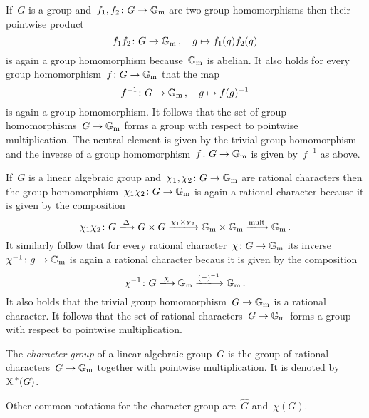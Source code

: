 \begin{fluff}
  If~$G$ is a group and~$f_1, f_2 \colon G \to \mathbb{G}_{\text{m}}$ are two group homomorphisms then their pointwise product
  \[
            f_1 f_2
    \colon  G
    \to     \mathbb{G}_{\text{m}} \,,
    \quad   g
    \mapsto f_1(g) f_2(g)
  \]
  is again a group homomorphism because~$\mathbb{G}_{\text{m}}$ is abelian.
  It also holds for every group homomorphism~$f \colon G \to \mathbb{G}_{\text{m}}$ that the map
  \[
            f^{-1}
    \colon  G
    \to     \mathbb{G}_{\text{m}} \,,
    \quad   g
    \mapsto f(g)^{-1}
  \]
  is again a group homomorphism.
  It follows that the set of group homomorphisms~$G \to \mathbb{G}_{\text{m}}$ forms a group with respect to pointwise multiplication.
  The neutral element is given by the trivial group homomorphism and the inverse of a group homomorphism~$f \colon G \to \mathbb{G}_{\text{m}}$ is given by~$f^{-1}$ as above.
  
  If~$G$ is a linear algebraic group and~$\chi_1, \chi_2 \colon G \to \mathbb{G}_{\text{m}}$ are rational characters then the group homomorphism~$\chi_1 \chi_2 \colon G \to \mathbb{G}_{\text{m}}$ is again a rational character because it is given by the composition
  \[
    \chi_1 \chi_2
    \colon
    G
    \xlongrightarrow{\Delta}
    G \times G
    \xlongrightarrow{\chi_1 \times \chi_2}
    \Gmult \times \Gmult
    \xlongrightarrow{\text{mult}}
    \Gmult \,.
  \]
  It similarly follow that for every rational character~$\chi \colon G \to \mathbb{G}_{\text{m}}$ its inverse~$\chi^{-1} \colon g \to \mathbb{G}_{\text{m}}$ is again a rational character becaus it is given by the composition
  \[
    \chi^{-1}
    \colon
    G
    \xlongrightarrow{\chi}
    \Gmult
    \xlongrightarrow{(-)^{-1}}
    \Gmult \,.
  \]
  It also holds that the trivial group homomorphism~$G \to \mathbb{G}_{\text{m}}$ is a rational character.
  It follows that the set of rational characters~$G \to \mathbb{G}_{\text{m}}$ forms a group with respect to pointwise multiplication.
\end{fluff}


\begin{definition}
  The \emph{character group} of a linear algebraic group~$G$ is the group of rational characters~$G \to \mathbb{G}_{\text{m}}$ together with pointwise multiplication.
  It is denoted by~$\operatorname{X}^{\,*}(G)$.
\end{definition}


\begin{remark}
  Other common notations for the character group are~$\widehat{G}$ and~$\chi(G)$.
\end{remark}



